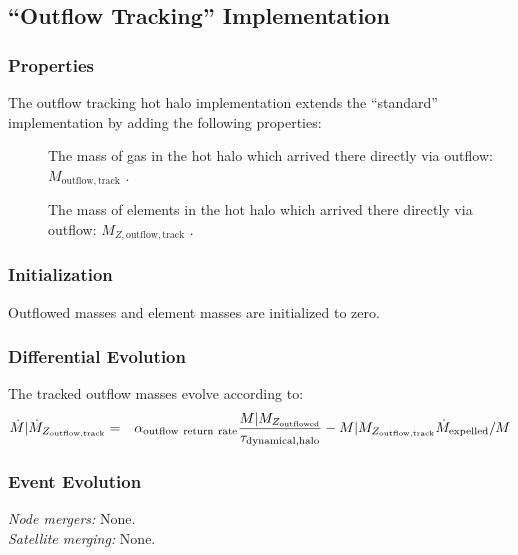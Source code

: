 \subsection{``Outflow Tracking'' Implementation}

\subsubsection{Properties}

The outflow tracking hot halo implementation extends the ``standard'' implementation by adding the following properties:
\begin{description}
 \item [] The mass of gas in the hot halo which arrived there directly via outflow: $M_\mathrm{outflow, track}$ \mono{[hotHaloTrackedOutflowMass]}.
 \item [] The mass of elements in the hot halo which arrived there directly via outflow: $M_{Z, \mathrm{outflow, track}}$ \mono{[hotHaloTrackedOutflowAbundances]}.
\end{description}

\subsubsection{Initialization}

Outflowed masses and element masses are initialized to zero.

\subsubsection{Differential Evolution}

The tracked outflow masses evolve according to:
\begin{eqnarray}
 \dot{M}|\dot{M}_{Z_\mathrm{outflow, track}} &=& \alpha_\mathrm{outflow~return~rate} {M|M_{Z_\mathrm{outflowed}}\over \tau_\mathrm{dynamical, halo}} -  M|M_{Z_\mathrm{outflow, track}} \dot{M}_\mathrm{expelled} / M\\
\end{eqnarray}

\subsubsection{Event Evolution}

\noindent\emph{Node mergers:} None.\\

\noindent\emph{Satellite merging:} None.\\

